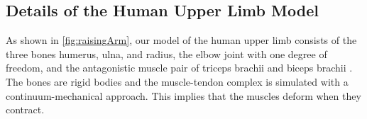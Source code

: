 \subsection{Details of the Human Upper Limb Model}
\label{sec:712details}


As shown in \cref{fig:raisingArm},
our model of the human upper limb consists
of the three bones humerus, ulna, and radius,
the elbow joint with one degree of freedom, and
the antagonistic muscle pair of triceps brachii and biceps brachii
\cite{Valentin18Gradient}.
The bones are rigid bodies and the muscle-tendon complex
is simulated with a continuum-mechanical approach.
This implies that the muscles deform when they contract.

